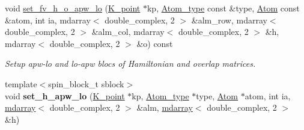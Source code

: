 \begin{DoxyCompactItemize}
\item 
void \hyperlink{classsirius_1_1_band_ad74e640cc61cf64984a300dd2c44ee04}{set\+\_\+fv\+\_\+h\+\_\+o\+\_\+apw\+\_\+lo} (\hyperlink{classsirius_1_1_k__point}{K\+\_\+point} $\ast$kp, \hyperlink{classsirius_1_1_atom__type}{Atom\+\_\+type} const \&type, \hyperlink{classsirius_1_1_atom}{Atom} const \&atom, int ia, mdarray$<$ double\+\_\+complex, 2 $>$ \&alm\+\_\+row, mdarray$<$ double\+\_\+complex, 2 $>$ \&alm\+\_\+col, mdarray$<$ double\+\_\+complex, 2 $>$ \&h, mdarray$<$ double\+\_\+complex, 2 $>$ \&o) const 
\begin{DoxyCompactList}\small\item\em Setup apw-\/lo and lo-\/apw blocs of Hamiltonian and overlap matrices. \end{DoxyCompactList}\item 
\hypertarget{classsirius_1_1_band_a9bfab0f46ad6fb77af05733cdac49f15}{}{\footnotesize template$<$spin\+\_\+block\+\_\+t sblock$>$ }\\void {\bfseries set\+\_\+h\+\_\+apw\+\_\+lo} (\hyperlink{classsirius_1_1_k__point}{K\+\_\+point} $\ast$kp, \hyperlink{classsirius_1_1_atom__type}{Atom\+\_\+type} $\ast$type, \hyperlink{classsirius_1_1_atom}{Atom} $\ast$atom, int ia, \hyperlink{classsddk_1_1mdarray}{mdarray}$<$ double\+\_\+complex, 2 $>$ \&alm, \hyperlink{classsddk_1_1mdarray}{mdarray}$<$ double\+\_\+complex, 2 $>$ \&h)\label{classsirius_1_1_band_a9bfab0f46ad6fb77af05733cdac49f15}


\end{DoxyCompactItemize}
